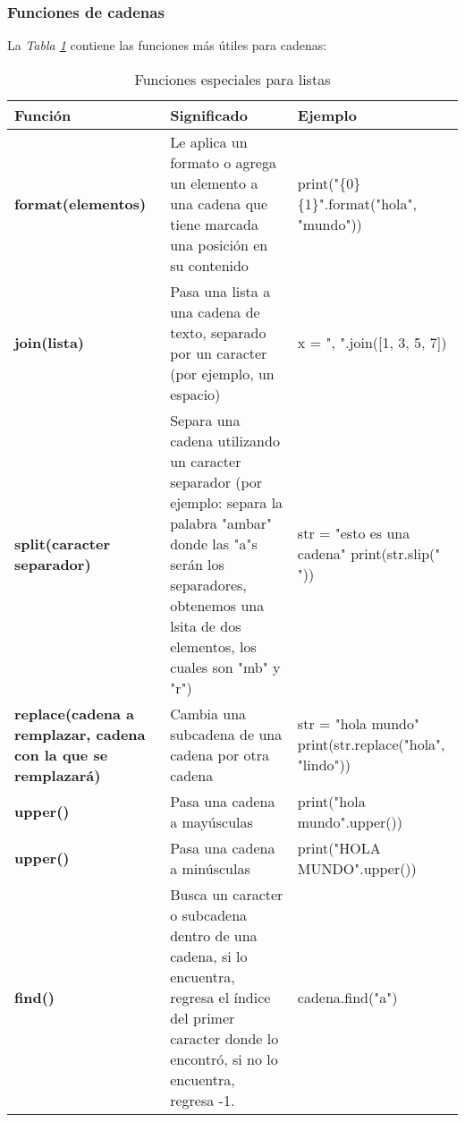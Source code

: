 \subsubsection{Funciones de cadenas}
\hspace{0.55cm}La \textit{Tabla \ref{tab: 5}} contiene las funciones más útiles para cadenas:
\begin{table}[H]
    \begin{center}
        \caption{Funciones especiales para listas}
        \label{tab: 5}
        \begin{tabular}{m{4cm} m{5cm} m{4cm}}
            \hline
            \textbf{Función}&\textbf{Significado}&\textbf{Ejemplo} \\
            \hline
            \textbf{format(elementos)}			& Le aplica un formato o agrega un elemento a una cadena que tiene marcada una posición en su contenido		& print("\{0\} \{1\}".format("hola", "mundo")) \\
            \textbf{join(lista)}				& Pasa una lista a una cadena de texto, separado por un caracter (por ejemplo, un espacio)						& x = ", ".join([1, 3, 5, 7]) \\
            \textbf{split(caracter separador)}	& Separa una cadena utilizando un caracter separador (por ejemplo: separa la palabra "ambar" donde las "a"s serán los separadores, obtenemos una lsita de dos elementos, los cuales son "mb" y "r")																								& str = "esto es una cadena" print(str.slip(" ")) \\
            \textbf{replace(cadena a remplazar, cadena con la que se remplazará)}		& Cambia una subcadena de una cadena por otra cadena					& str = "hola mundo" print(str.replace("hola", "lindo")) \\
            \textbf{upper()}					& Pasa una cadena a mayúsculas																					& print("hola mundo".upper()) \\
            \textbf{upper()}					& Pasa una cadena a minúsculas																					& print("HOLA MUNDO".upper()) \\
            \textbf{find()}					& Busca un caracter o subcadena dentro de una cadena, si lo encuentra, regresa el índice del primer caracter donde lo encontró, si no lo encuentra, regresa -1.															& cadena.find("a") \\
            \hline
        \end{tabular}
    \end{center}    
\end{table}



